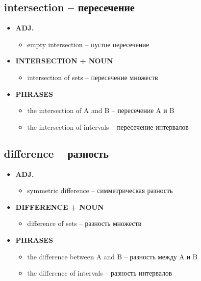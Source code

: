 \documentclass[a4paper, 10pt]{article}
\theoremstyle{definition}
\theoremstyle{plain}
\theoremstyle{remark}
\begin{document}
\subsection{intersection – пересечение}

\begin{itemize}
    \item \textbf{ADJ.}
    \begin{itemize}
        \item empty intersection – пустое пересечение
    \end{itemize}
    
    \item \textbf{INTERSECTION + NOUN}
    \begin{itemize}
        \item intersection of sets – пересечение множеств
    \end{itemize}
    
    \item \textbf{PHRASES}
    \begin{itemize}
        \item the intersection of A and B – пересечение A и B
        \item the intersection of intervals – пересечение интервалов
    \end{itemize}
\end{itemize}

\subsection{difference – разность}

\begin{itemize}
    \item \textbf{ADJ.}
    \begin{itemize}
        \item symmetric difference – симметрическая разность
    \end{itemize}
    
    \item \textbf{DIFFERENCE + NOUN}
    \begin{itemize}
        \item difference of sets – разность множеств
    \end{itemize}
    
    \item \textbf{PHRASES}
    \begin{itemize}
        \item the difference between A and B – разность между A и B
        \item the difference of intervals – разность интервалов
    \end{itemize}
\end{itemize}
\end{document}
